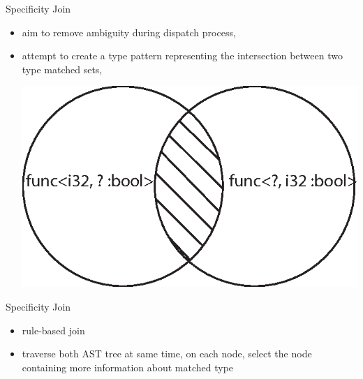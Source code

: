 \documentclass{beamer}
\begin{document}
\begin{frame}{Specificity Join}
\begin{itemize}
    \item aim to remove ambiguity during dispatch process,
    \item attempt to create a type pattern representing the intersection
          between two type matched sets,
          \begin{center}
              \includegraphics{Fig_Intersection}
          \end{center}
\end{itemize}
\end{frame}

\begin{frame}{Specificity Join}
\begin{itemize}
    \item rule-based join
    \item traverse both AST tree at same time, on each node, select the node
          containing more information about matched type 
\end{itemize}
\end{frame}
\end{document}
